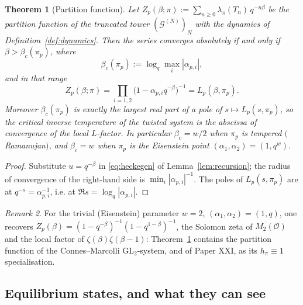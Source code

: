 \documentclass[11pt]{amsart}
\numberwithin{equation}{section}
\newtheorem{theorem}{Theorem}[section]
\theoremstyle{definition}
\theoremstyle{remark}
\newtheorem{remark}[theorem]{Remark}
\newcommand{\cG}{\mathcal{G}}
\newcommand{\cO}{\mathcal{O}}
\newcommand{\GL}{\mathrm{GL}}
\begin{document}
\begin{theorem}[Partition function]\label{thm:partition}
Let $Z_p(\beta;\pi):=\sum_{n\ge0}\lambda_\pi(T_n)\,q^{-n\beta}$ be the partition function
of the truncated tower $(\cG^{(N)})_N$ with the dynamics of
Definition~\ref{def:dynamics}. Then the series converges absolutely if and only if
$\beta>\beta_c(\pi_p)$, where
\[
\beta_c(\pi_p):=\log_q\max_i|\alpha_{p,i}|,
\]
and in that range
\[
\boxed{\;Z_p(\beta;\pi)=\prod_{i=1,2}\bigl(1-\alpha_{p,i}q^{-\beta}\bigr)^{-1}
=L_p(\beta,\pi_p).\;}
\]
Moreover $\beta_c(\pi_p)$ is exactly the largest real part of a pole of
$s\mapsto L_p(s,\pi_p)$, so the critical inverse temperature of the twisted system is the
abscissa of convergence of the local $L$-factor. In particular
$\beta_c=w/2$ when $\pi_p$ is tempered $($Ramanujan$)$, and $\beta_c=w$ when $\pi_p$ is the
Eisenstein point $(\alpha_1,\alpha_2)=(1,q^{w})$.
\end{theorem}

\begin{proof}
Substitute $u=q^{-\beta}$ in \eqref{eq:heckegen} of Lemma~\ref{lem:recursion}; the radius
of convergence of the right-hand side is $\min_i|\alpha_{p,i}|^{-1}$. The poles of
$L_p(s,\pi_p)$ are at $q^{-s}=\alpha_{p,i}^{-1}$, i.e. at
$\Re s=\log_q|\alpha_{p,i}|$.
\end{proof}

\begin{remark}
For the trivial (Eisenstein) parameter $w=2$, $(\alpha_1,\alpha_2)=(1,q)$, one recovers
$Z_p(\beta)=(1-q^{-\beta})^{-1}(1-q^{1-\beta})^{-1}$, the Solomon zeta of $M_2(\cO)$ and
the local factor of $\zeta(\beta)\zeta(\beta-1)$: Theorem~\ref{thm:partition} contains
the partition function of the Connes--Marcolli $\GL_2$-system, and of Paper XXI, as its
$h_\pi\equiv1$ specialisation.
\end{remark}

\subsection{Equilibrium states, and what they can see}
\end{document}
